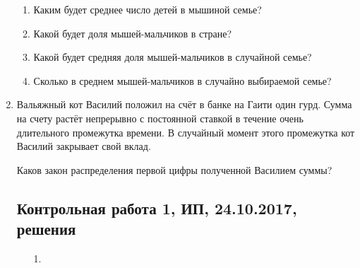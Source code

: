 \begin{enumerate}
\begin{enumerate}
  \item Каким будет среднее число детей в мышиной семье?
  \item Какой будет доля мышей-мальчиков в стране?
  \item Какой будет средняя доля мышей-мальчиков в случайной семье?
  \item Сколько в среднем мышей-мальчиков в случайно выбираемой семье?
\end{enumerate}

\item Вальяжный кот Василий положил на счёт в банке на Гаити один гурд. Сумма на счету растёт непрерывно с постоянной ставкой в течение очень длительного промежутка времени. В случайный момент этого промежутка кот Василий закрывает свой вклад.

Каков закон распределения первой цифры полученной Василием суммы?

\subsection{Контрольная работа 1, ИП, 24.10.2017, решения}


\begin{enumerate}

\item[1.]


\end{enumerate}
\end{enumerate}
